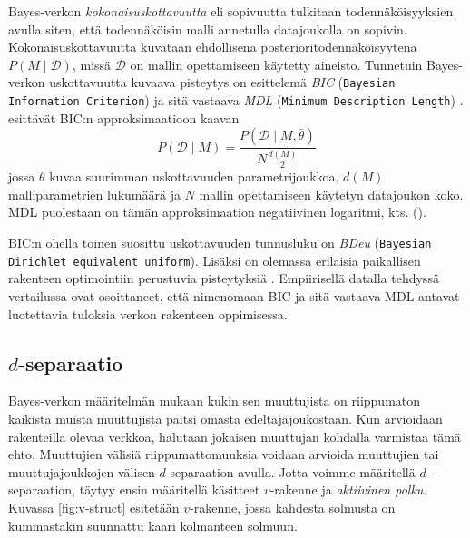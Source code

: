Bayes-verkon \emph{kokonaisuskottavuutta} eli sopivuutta \citep{myllymaki_bayes-verkkojen_1998} tulkitaan todennäköisyyksien avulla siten, että todennäköisin malli annetulla datajoukolla on sopivin. Kokonaisuskottavuutta kuvataan ehdollisena posterioritodennäköisyytenä $P(M \mid \mathcal{D})$, missä $\mathcal{D}$ on mallin opettamiseen käytetty aineisto. Tunnetuin Bayes-verkon uskottavuutta kuvaava pisteytys on \citet{schwarz_estimating_1978} esittelemä \emph{BIC} (\texttt{Bayesian Information Criterion}) ja sitä vastaava \emph{MDL} (\texttt{Minimum Description Length}) \citep{ruggeri_bayesian_2008, liu_empirical_2012}. \citet{myllymaki_bayes-verkkojen_1998} esittävät BIC:n approksimaatioon kaavan 
$$ 
P(\mathcal{D} \mid M) = \frac{P(\mathcal{D}\mid M, \bar{\theta})}{N{\frac{d(M)}{2}}} 
$$ 
jossa $\bar{\theta}$ kuvaa suurimman uskottavuuden parametrijoukkoa, $d(M)$ malliparametrien lukumäärä ja $N$ mallin opettamiseen käytetyn datajoukon koko. MDL puolestaan on tämän approksimaation negatiivinen logaritmi, kts. (\cite{rissanen_stochastic_1987}). 

BIC:n ohella toinen suosittu uskottavuuden tunnusluku on \emph{BDeu} (\texttt{Bayesian Dirichlet equivalent uniform}). Lisäksi on olemassa erilaisia paikallisen rakenteen optimointiin perustuvia pisteytyksiä \citep{scanagatta_survey_2019}.   Empiirisellä datalla tehdyssä vertailussa \citet{liu_empirical_2012} ovat osoittaneet, että nimenomaan BIC ja sitä vastaava MDL antavat luotettavia tuloksia verkon rakenteen oppimisessa. 

\subsection{$d$-separaatio}\label{dsep} 

Bayes-verkon määritelmän mukaan kukin sen muuttujista on riippumaton kaikista muista muuttujista paitsi omasta edeltäjäjoukostaan. Kun arvioidaan rakenteilla olevaa verkkoa, halutaan jokaisen muuttujan kohdalla varmistaa tämä ehto. Muuttujien välisiä riippumattomuuksia voidaan arvioida muuttujien tai muuttujajoukkojen välisen $d$-separaation \citep{koller_probabilistic_2009} avulla. Jotta voimme määritellä $d$-separaation, täytyy ensin määritellä käsitteet $v$-rakenne ja \emph{aktiivinen polku}. Kuvassa \ref{fig:v-struct} esitetään $v$-rakenne, jossa kahdesta solmusta on kummastakin suunnattu kaari kolmanteen solmuun. 

\begin{center} 
\end{center} 

